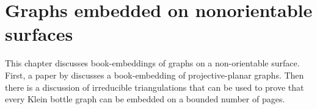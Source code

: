 \chapter{Graphs embedded on nonorientable surfaces}\label{chap:nonorientable}

This chapter discusses book-embeddings of graphs on a non-orientable surface. First, a paper by \textcite{nakamotoBookEmbeddingProjectiveplanar2015} discusses a book-embedding of projective-planar graphs. Then there is a discussion of irreducible triangulations that can be used to prove that every Klein bottle graph can be embedded on a bounded number of pages. 



%


